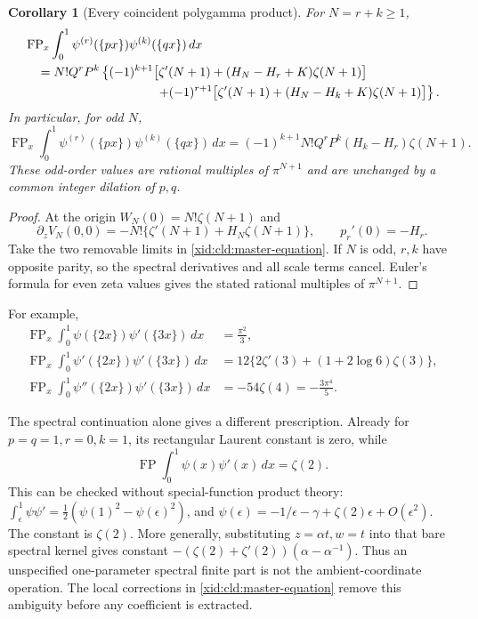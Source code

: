 \documentclass[11pt,a4paper]{article}
\numberwithin{equation}{section}
\newtheorem{corollary}[theorem]{Corollary}
\theoremstyle{definition}
\theoremstyle{remark}
\begin{document}
\begin{corollary}[Every coincident polygamma product]
For $N=r+k\ge1$,
\begin{align}
 &\operatorname{FP}_x\int_0^1
      \psi^{(r)}(\{px\})\psi^{(k)}(\{qx\})\,dx\notag\\
 &\quad=N!Q^rP^k\left\{
 (-1)^{k+1}\bigl[\zeta'(N+1)+(H_N-H_r+K)\zeta(N+1)\bigr]\right.\notag\\
 &\hspace{37mm}\left.
 +(-1)^{r+1}\bigl[\zeta'(N+1)+(H_N-H_k+K)\zeta(N+1)\bigr]
                         \right\}.
 \label{xid:cld:polygamma}
\end{align}
In particular, for odd $N$,
\begin{equation}
 \operatorname{FP}_x\int_0^1
      \psi^{(r)}(\{px\})\psi^{(k)}(\{qx\})\,dx
 =(-1)^{k+1}N!Q^rP^k(H_k-H_r)\zeta(N+1).
 \label{xid:cld:odd-parity}
\end{equation}
These odd-order values are rational multiples of $\pi^{N+1}$ and are
unchanged by a common integer dilation of $p,q$.
\end{corollary}
\begin{proof}
At the origin $W_N(0)=N!\zeta(N+1)$ and
\[
 \partial_z V_N(0,0)
 =-N!\{\zeta'(N+1)+H_N\zeta(N+1)\},
 \qquad p_r'(0)=-H_r.
\]
Take the two removable limits in \eqref{xid:cld:master-equation}.
If $N$ is odd, $r,k$ have opposite parity, so the spectral derivatives
and all scale terms cancel.  Euler's formula for even zeta values
gives the stated rational multiples of $\pi^{N+1}$.
\end{proof}

For example,
\begin{align}
 \operatorname{FP}_x\int_0^1\psi(\{2x\})\psi'(\{3x\})\,dx
      &=\frac{\pi^2}{3},\\
 \operatorname{FP}_x\int_0^1\psi'(\{2x\})\psi'(\{3x\})\,dx
      &=12\{2\zeta'(3)+(1+2\log6)\zeta(3)\},\\
 \operatorname{FP}_x\int_0^1\psi''(\{2x\})\psi'(\{3x\})\,dx
      &=-54\zeta(4)=-\frac{3\pi^4}{5}.
 \label{xid:cld:examples}
\end{align}

The spectral continuation alone gives a different prescription.  Already
for $p=q=1,r=0,k=1$, its rectangular Laurent constant is zero, while
\[
 \operatorname{FP}\int_0^1\psi(x)\psi'(x)\,dx=\zeta(2).
\]
This can be checked without special-function product theory:
$\int_\epsilon^1\psi\psi'=\tfrac12(\psi(1)^2-\psi(\epsilon)^2)$,
and $\psi(\epsilon)=-1/\epsilon-\gamma+\zeta(2)\epsilon+O(\epsilon^2)$.
The constant is $\zeta(2)$.
More generally, substituting $z=\alpha t,w=t$ into that bare spectral
kernel gives constant
$-(\zeta(2)+\zeta'(2))(\alpha-\alpha^{-1})$.
Thus an unspecified one-parameter spectral finite part is not the
ambient-coordinate operation.  The local corrections in
\eqref{xid:cld:master-equation} remove this ambiguity before any coefficient
is extracted.
\end{document}
